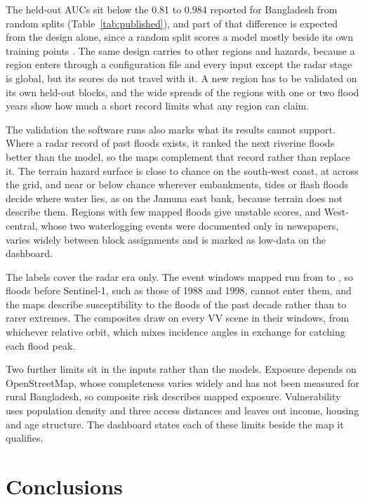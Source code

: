 \documentclass[preprint,12pt]{elsarticle}
\begin{document}
The held-out AUCs sit below the 0.81 to 0.984 reported for Bangladesh from random splits (Table~\ref{tab:published}), and part of that difference is expected from the design alone, since a random split scores a model mostly beside its own training points \citep{roberts2017, ploton2020}. The same design carries to other regions and hazards, because a region enters through a configuration file and every input except the radar stage is global, but its scores do not travel with it. A new region has to be validated on its own held-out blocks, and the wide spreads of the regions with one or two flood years show how much a short record limits what any region can claim.

The validation the software runs also marks what its results cannot support. Where a radar record of past floods exists, it ranked the next riverine floods better than the model, so the maps complement that record rather than replace it. The terrain hazard surface is close to chance on the south-west coast, at \CoastalSurfaceTerrainObsAUC{} across the grid, and near or below chance wherever embankments, tides or flash floods decide where water lies, as on the Jamuna east bank, because terrain does not describe them. Regions with few mapped floods give unstable scores, and West-central, whose two waterlogging events were documented only in newspapers, varies widely between block assignments and is marked as low-data on the dashboard.

The labels cover the radar era only. The \NatEventWindows{} event windows mapped run from \NatEventFirst{} to \NatEventLast{}, so floods before Sentinel-1, such as those of 1988 and 1998, cannot enter them, and the maps describe susceptibility to the floods of the past decade rather than to rarer extremes. The composites draw on every VV scene in their windows, from whichever relative orbit, which mixes incidence angles in exchange for catching each flood peak.

Two further limits sit in the inputs rather than the models. Exposure depends on OpenStreetMap, whose completeness varies widely \citep{herfort2023} and has not been measured for rural Bangladesh, so composite risk describes mapped exposure. Vulnerability uses population density and three access distances and leaves out income, housing and age structure. The dashboard states each of these limits beside the map it qualifies.

\section{Conclusions}
\end{document}
